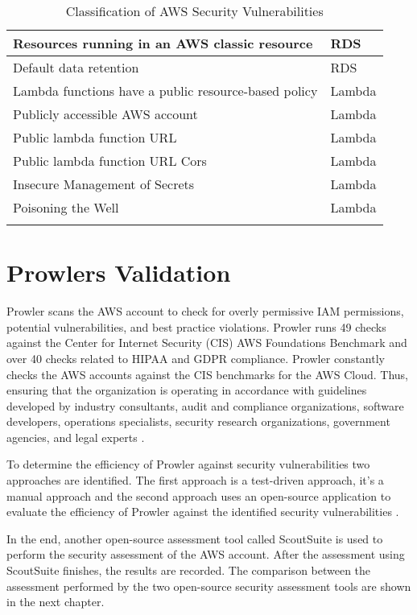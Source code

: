 \begin{longtable}{|p{12cm}|p{2.4cm}|}
    \hline
    Resources running in an AWS classic resource & RDS \\
    \hline
    Default data retention & RDS \\
    \hline
    Lambda functions have a public resource-based policy & Lambda \\
    \hline
    Publicly accessible AWS account & Lambda \\
    \hline
    Public lambda function URL & Lambda \\
    \hline
    Public lambda function URL Cors & Lambda \\
    \hline
    Insecure Management of Secrets & Lambda \\
    \hline
    Poisoning the Well & Lambda \\
    \hline
    \caption{Classification of AWS Security Vulnerabilities}
    \label{tab:classificationofsecurityvulnerabilities}
\end{longtable}

\section{Prowlers Validation}

\par Prowler scans the AWS account to check for overly permissive IAM permissions, potential vulnerabilities, and best practice violations. Prowler runs 49 checks against the Center for Internet Security (CIS) AWS Foundations Benchmark and over 40 checks related to HIPAA and GDPR compliance. Prowler constantly checks the AWS accounts against the CIS benchmarks for the AWS Cloud. Thus, ensuring that the organization is operating in accordance with guidelines developed by industry consultants, audit and compliance organizations, software developers, operations specialists, security research organizations, government agencies, and legal experts \cite{66}.

\par To determine the efficiency of Prowler against security vulnerabilities two approaches are identified.
The first approach is a test-driven approach, it’s a manual approach and the second approach uses an open-source application to evaluate the efficiency of Prowler against the identified security vulnerabilities \cite{37}.

\par In the end, another open-source assessment tool called ScoutSuite is used to perform the security assessment of the AWS account.
After the assessment using ScoutSuite finishes, the results are recorded.
The comparison between the assessment performed by the two open-source security
assessment tools are shown in the next chapter.

